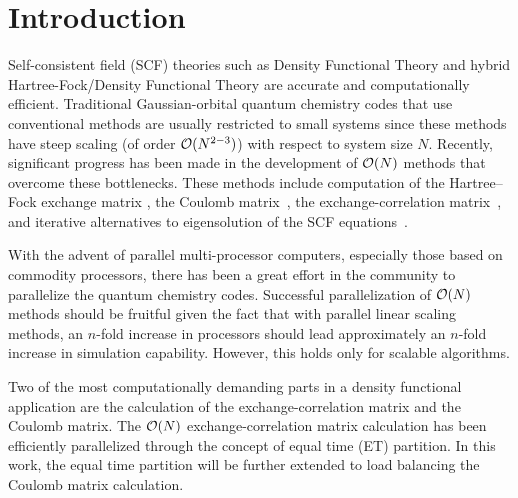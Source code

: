 \commentoutA{\documentclass[prl,aps,twocolumn,twocolumngrid,superbib]{revtex4}}
\begin{document}

\section{Introduction}
\label{sec:intro}
Self-consistent field (SCF) theories such as Density Functional Theory
and hybrid Hartree-Fock/Density Functional Theory are accurate and
computationally efficient. Traditional Gaussian-orbital quantum
chemistry codes that use conventional methods\cite{ASzabo89} are
usually restricted to small systems since these methods have steep
scaling (of order ${\cal O}(N^{2-3})$) with respect to system size
$N$.  Recently, significant progress has been made in the development
of ${\cal O}(N)$ methods that overcome these bottlenecks.  These
methods include computation of the Hartree--Fock exchange matrix
\cite{ESchwegler96,ESchwegler97,ESchwegler98A,ESchwegler99,ESchwegler00,CTymczak04b},
the Coulomb
matrix~\cite{CWhite94B,CWhite96A,MChallacombe96,MChallacombe96B,MStrain96,JPerezjorda97,MChallacombe97,CTymczak04a},
the exchange-correlation
matrix~\cite{Jorda95,RStratmann96,CGuerra98,MChallacombe00A,CTymczak04a},
and iterative alternatives to eigensolution of the SCF
equations~\cite{XLi93,MDaw93,SQiu94,EHernandez96,ADaniels97,APalser98,MChallacombe99,ANiklasson02A,ANiklasson03}.

With the advent of parallel multi-processor computers, especially
those based on commodity processors, there has been a great effort in
the community to parallelize the quantum chemistry
codes\cite{Harrison_94v45,Guerra_95,Sosa_98v19,Stephan_98v108,Furlani_00v128,Sosa_00v26,Yoshihiro_01v346,Baker_02v23,JBaker04}.
Successful parallelization of ${\cal O}(N)$ methods should be fruitful
given the fact that with parallel linear scaling methods, an $n$-fold
increase in processors should lead approximately an $n$-fold increase
in simulation capability. However, this holds only for scalable
algorithms.

Two of the most computationally demanding parts in a density
functional application are the calculation of the exchange-correlation
matrix and the Coulomb matrix. The ${\cal O}(N)$ exchange-correlation
matrix calculation has been efficiently parallelized through the
concept of equal time (ET) partition\cite{CGan03}.  In this work, the
equal time partition will be further extended to load balancing the
Coulomb matrix calculation.
\end{document}
